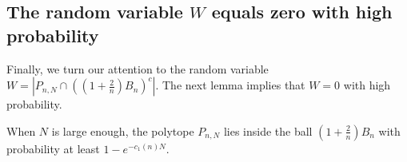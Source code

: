 
\subsection{The random variable $W$ equals zero with high probability}

Finally, we turn our attention to the random variable $W=|P_{n,N}\cap ((1+\frac{2}{n})B_n)^c|$. The next lemma implies that $W=0$ with high probability. %


\begin{lemma}{\label{Wconcentration}}
	When $N$ is large enough, the polytope $ P_{n,N} $ lies inside the ball $ (1+\frac{2}{n})B_n $ with probability at least $1-e^{-c_1(n)N}.$
\end{lemma}

